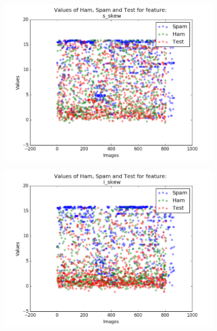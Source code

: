 \begin{figure}[h]
	\centering
	\begin{minipage}{.5\textwidth}
		\centering
		\includegraphics[width=\linewidth]{images/appA/s_skew_values_scatter}
		\label{fig:s_skew_values_scatter}
	\end{minipage}%
	\begin{minipage}{.5\textwidth}
		\centering
		\includegraphics[width=\linewidth]{images/appA/i_skew_values_scatter}
		\label{fig:i+skew_values_scatter}
	\end{minipage}
\end{figure}



